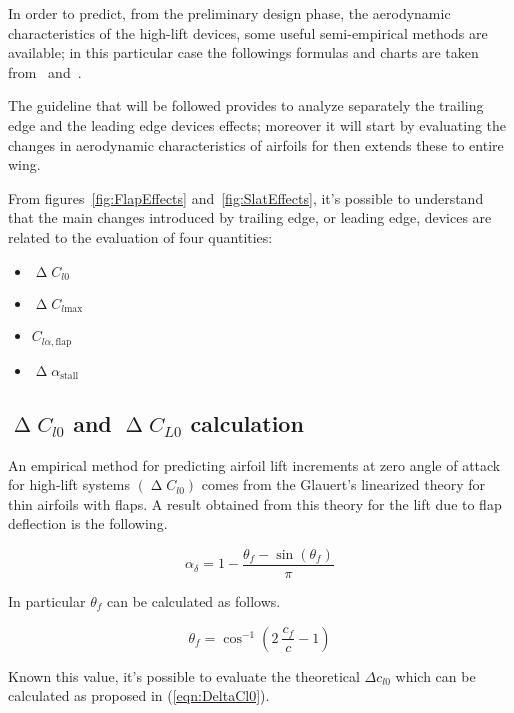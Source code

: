 \noindent
In order to predict, from the preliminary design phase, the aerodynamic characteristics of the high-lift devices, some useful semi-empirical methods are available; in this particular case the followings formulas and charts are taken from~\cite{torenbeek1982synthesis} and~\cite{sforza2014commercial}.

\bigskip
\noindent
The guideline that will be followed provides to analyze separately the trailing edge and the leading edge devices effects; moreover it will start by evaluating the changes in aerodynamic characteristics of airfoils for then extends these to entire wing.

From figures~\ref{fig:FlapEffects} and~\ref{fig:SlatEffects}, it's possible to understand that the main changes introduced by trailing edge, or leading edge, devices are related to the evaluation of four quantities:

\begin{itemize}
\item $\upDelta C_{l0}$
\item $\upDelta C_{l\text{max}}$
\item $C_{l\alpha, \text{flap}}$
\item $\upDelta\alpha_{\text{stall}}$
\end{itemize}

\subsection{$\upDelta C_{l0}$ and  $\upDelta C_{L0}$ calculation}
An empirical method for predicting airfoil lift increments at zero angle of attack for high-lift systems $\left(\upDelta C_{l0}\right)$ comes from the Glauert’s linearized theory for thin airfoils with flaps. A result obtained from this theory for the lift due to flap deflection is the following.

\begin{equation}
\alpha_\delta=1-\frac{\theta_f-\sin(\theta_f)}{\pi}
\label{eqn:AlphaDelta}
\end{equation}

\noindent
In particular $\theta_f$ can be calculated as follows.

\begin{equation}
\theta_f=\cos^{-1}\left(2\ \frac{c_f}{c}-1\right)
\label{eqn:ThetaF}
\end{equation}

\noindent
Known this value, it's possible to evaluate the theoretical $\Delta c_{l0}$ which can be calculated as proposed in (\ref{eqn:DeltaCl0}).

